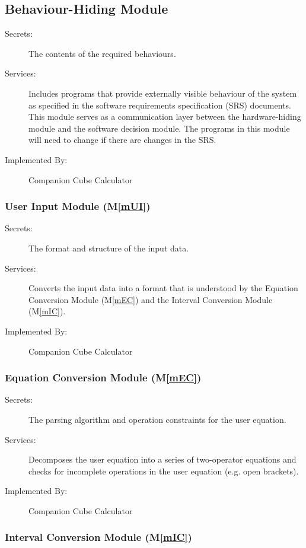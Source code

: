 \documentclass[12pt, titlepage]{article}
\newcommand{\mref}[1]{M\ref{#1}}
\newcommand{\progname}{Companion Cube Calculator} %
\begin{document}
\subsection{Behaviour-Hiding Module}

\begin{description}
\item[Secrets:]The contents of the required behaviours.
\item[Services:]Includes programs that provide externally visible behaviour of
  the system as specified in the software requirements specification (SRS)
  documents. This module serves as a communication layer between the
  hardware-hiding module and the software decision module. The programs in this
  module will need to change if there are changes in the SRS.
\item[Implemented By:] \progname{}
\end{description}

\subsubsection{User Input Module (\mref{mUI})}

\begin{description}
\item[Secrets:] The format and structure of the input data.
\item[Services:] Converts the input data into a format that is understood by 
the Equation Conversion Module (\mref{mEC}) and the Interval Conversion Module 
(\mref{mIC}).
\item[Implemented By:] \progname{}
\end{description}

\subsubsection{Equation Conversion Module (\mref{mEC})}

\begin{description}
	\item[Secrets:]The parsing algorithm and operation constraints for the user 
	equation.
	\item[Services:]Decomposes the user equation into a series of two-operator 
	equations and checks for incomplete operations in the user equation (e.g. 
	open brackets).
	\item[Implemented By:] \progname{}
\end{description}

\subsubsection{Interval Conversion Module (\mref{mIC})}
\end{document}
